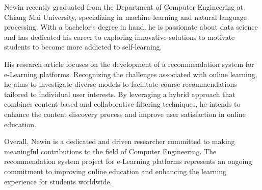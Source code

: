 \documentclass[final,isne,project]{cpecmu}
\begin{document}
\begin{biosketch}


\textsf{Newin recently graduated from the Department of Computer Engineering 
at Chiang Mai University, specializing in machine learning and natural 
language processing. With a bachelor's degree in hand, he is passionate 
about data science and has dedicated his career to exploring innovative 
solutions to motivate students to become more addicted to self-learning.}

\textsf{His research article focuses on the development of a recommendation 
system for e-Learning platforms. Recognizing the challenges associated with 
online learning, he aims to investigate diverse models to facilitate course 
recommendations tailored to individual user interests. By leveraging a hybrid 
approach that combines content-based and collaborative filtering techniques, 
he intends to enhance the content discovery process and improve user satisfaction 
in online education.}

\textsf{Overall, Newin is a dedicated and driven researcher committed to making 
meaningful contributions to the field of Computer Engineering. The recommendation 
system project for e-Learning platforms represents an ongoing commitment to 
improving online education and enhancing the learning experience for students 
worldwide.}

\end{biosketch}

\fi
\end{document}
